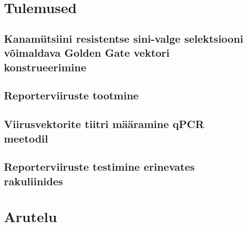 \documentclass{trkut}%
\begin{document}
\section{Tulemused}

\subsection{Kanamütsiini resistentse sini-valge selektsiooni võimaldava Golden Gate vektori konstrueerimine}

\subsection{Reporterviiruste tootmine}

\subsection{Viirusvektorite tiitri määramine qPCR meetodil}

\subsection{Reporterviiruste testimine erinevates rakuliinides}

\section{Arutelu}
\end{document}
